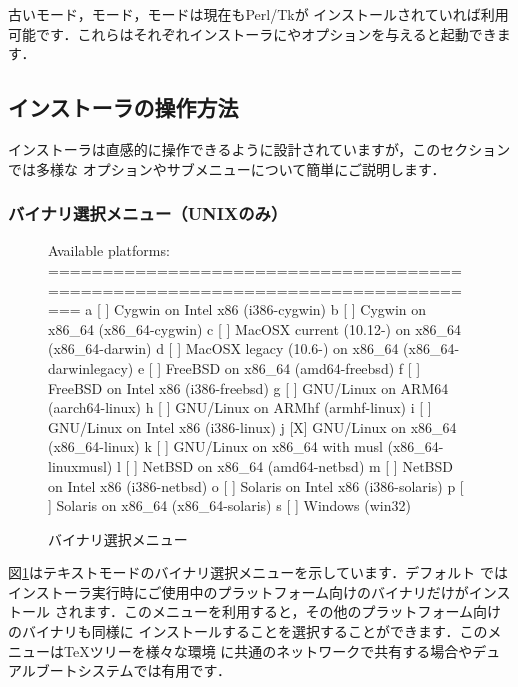 \documentclass[uplatex,dvipdfmx]{jsarticle}
\begin{document}
古いモード，モード，モードは現在もPerl/Tkが
インストールされていれば利用可能です．これらはそれぞれインストーラにやオプションを与えると起動できます．

\subsection{インストーラの操作方法}
\label{sec:runinstall}

インストーラは直感的に操作できるように設計されていますが，このセクションでは多様な
オプションやサブメニューについて簡単にご説明します．

\subsubsection{バイナリ選択メニュー（UNIXのみ）}
\label{sec:binary}

\begin{figure}[tb]
\begin{boxedverbatim}
Available platforms:
===============================================================================
   a [ ] Cygwin on Intel x86 (i386-cygwin)
   b [ ] Cygwin on x86_64 (x86_64-cygwin)
   c [ ] MacOSX current (10.12-) on x86_64 (x86_64-darwin)
   d [ ] MacOSX legacy (10.6-) on x86_64 (x86_64-darwinlegacy)
   e [ ] FreeBSD on x86_64 (amd64-freebsd)
   f [ ] FreeBSD on Intel x86 (i386-freebsd)
   g [ ] GNU/Linux on ARM64 (aarch64-linux)
   h [ ] GNU/Linux on ARMhf (armhf-linux)
   i [ ] GNU/Linux on Intel x86 (i386-linux)
   j [X] GNU/Linux on x86_64 (x86_64-linux)
   k [ ] GNU/Linux on x86_64 with musl (x86_64-linuxmusl)
   l [ ] NetBSD on x86_64 (amd64-netbsd)
   m [ ] NetBSD on Intel x86 (i386-netbsd)
   o [ ] Solaris on Intel x86 (i386-solaris)
   p [ ] Solaris on x86_64 (x86_64-solaris)
   s [ ] Windows (win32)
\end{boxedverbatim}
\vspace{-1zh}
\caption{バイナリ選択メニュー}\label{fig:bin-text}
\end{figure}

図\ref{fig:bin-text}はテキストモードのバイナリ選択メニューを示しています．デフォルト
ではインストーラ実行時にご使用中のプラットフォーム向けのバイナリだけがインストール
されます．このメニューを利用すると，その他のプラットフォーム向けのバイナリも同様に
インストールすることを選択することができます．このメニューは\TeX ツリーを様々な環境
に共通のネットワークで共有する場合やデュアルブートシステムでは有用です．
\end{document}
